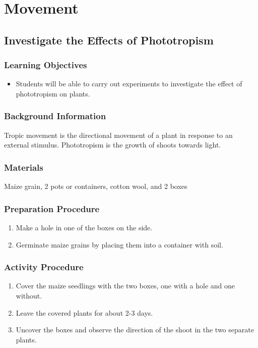 \section{Movement}

\subsection{Investigate the Effects of Phototropism}

\subsubsection*{Learning Objectives}
\begin{itemize}
\item{Students will be able to carry out experiments to investigate the effect of phototropism on plants.}
\end{itemize}

\subsubsection*{Background Information}
Tropic movement is the directional movement of a plant in response to an external stimulus. Phototropism is the growth of shoots towards light.

\subsubsection*{Materials}
Maize grain, 2 pots or containers, cotton wool, and 2 boxes

\subsubsection*{Preparation Procedure}
\begin{enumerate}
\item{Make a hole in one of the boxes on the side.}
\item{Germinate maize grains by placing them into a container with soil.}
\end{enumerate}

\subsubsection*{Activity Procedure}
\begin{enumerate}
\item{Cover the maize seedlings with the two boxes, one with a hole and one without.}
\item{Leave the covered plants for about 2-3 days.}
\item{Uncover the boxes and observe the direction of the shoot in the two separate plants.}
\end{enumerate}

